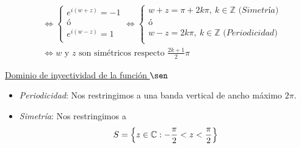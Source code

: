 \begin{enumerate}
\begin{align*}
                              & \Longleftrightarrow \left\{ \begin{array}{lcc}
                                                                e^{i(w+z)} = -1 \\
                                                                \text{ó}        \\
                                                                e^{i(w-z)} = 1  \\
                                                            \end{array}
              \right. \Longleftrightarrow \left\{ \begin{array}{lcc}
                                                      w + z = \pi + 2k\pi, \ k \in \mathbb{Z} \textit{ (Simetría)} \\
                                                      \text{ó}                                                     \\
                                                      w - z = 2k\pi, \ k \in \mathbb{Z} \textit{ (Periodicidad)}   \\
                                                  \end{array}
              \right.                                                                                                                                         \\
                              & \Longleftrightarrow w \text{ y } z \text{ son simétricos respecto  } \frac{2k +1}{2}\pi
          \end{align*}

          \underline{Dominio de inyectividad de la función $\sen$}
          \begin{itemize}
              \item \textit{Periodicidad}: Nos restringimos a una  banda vertical de ancho máximo $2\pi$.
              \item \textit{Simetría}: Nos restringimos a
                    \begin{align*}
                        S = \left\{ z \in \mathbb{C} : -\frac{\pi}{2} < z < \frac{\pi}{2} \right\}
                    \end{align*}
          \end{itemize}
\end{enumerate}